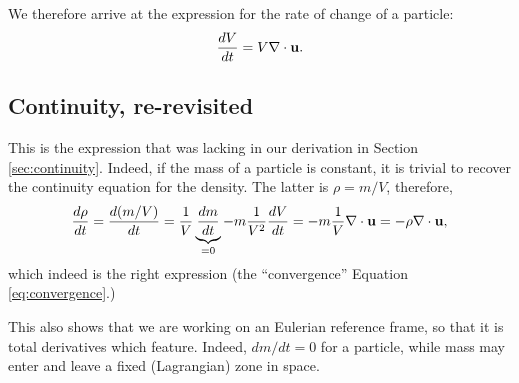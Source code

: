 We therefore arrive at the expression for the rate of change of a particle:
\[
\frac{d V}{dt} = V  \nabla\cdot \mathbf{u} .
\]

\subsection{Continuity, re-revisited}
\label{sec:continuity3}

This is the expression that was lacking in our derivation in
Section \ref{sec:continuity}. Indeed, if the mass of a particle is
constant, it is trivial to recover the continuity equation for the
density. The latter is $\rho=m/V$, therefore,
\[
\frac{d \rho }{dt} =
\frac{d (m/V) }{dt} = \frac1V \underbrace{\frac{ dm }{dt}}_{=0} -
m\frac1{V^2}  \frac{ dV }{dt } =
- m\frac1{V}  \nabla\cdot \mathbf{u}  = -\rho \nabla\cdot \mathbf{u} ,
\]
which indeed is the right expression (the ``convergence'' Equation
\ref{eq:convergence}.)

This also shows that we are working on an Eulerian reference frame, so
that it is total derivatives which feature. Indeed, $dm/dt=0$ for a
particle, while mass may enter and leave a fixed (Lagrangian) zone in
space.

